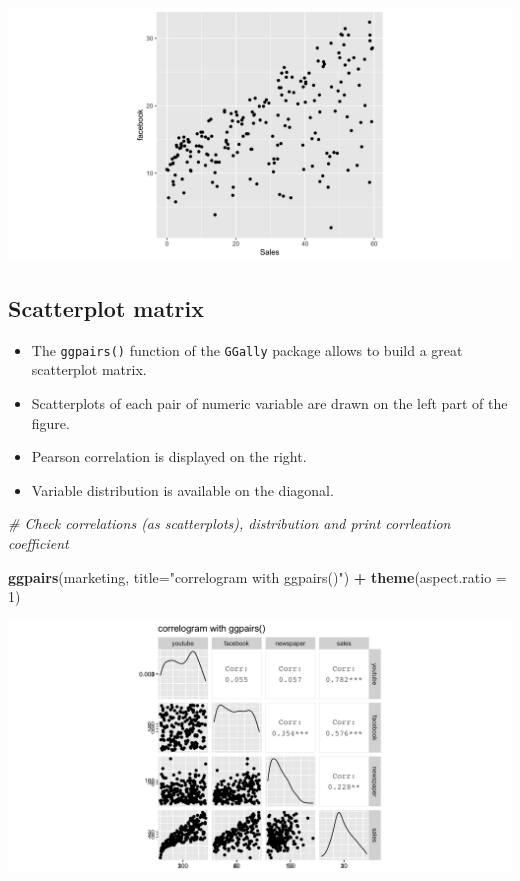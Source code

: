 \documentclass[]{book}
\newenvironment{Shaded}{\begin{snugshade}}{\end{snugshade}}
\newcommand{\CommentTok}[1]{\textcolor[rgb]{0.56,0.35,0.01}{\textit{#1}}}
\newcommand{\DataTypeTok}[1]{\textcolor[rgb]{0.13,0.29,0.53}{#1}}
\newcommand{\DecValTok}[1]{\textcolor[rgb]{0.00,0.00,0.81}{#1}}
\newcommand{\KeywordTok}[1]{\textcolor[rgb]{0.13,0.29,0.53}{\textbf{#1}}}
\newcommand{\NormalTok}[1]{#1}
\newcommand{\OperatorTok}[1]{\textcolor[rgb]{0.81,0.36,0.00}{\textbf{#1}}}
\newcommand{\StringTok}[1]{\textcolor[rgb]{0.31,0.60,0.02}{#1}}
\providecommand{\tightlist}{%
  \setlength{\itemsep}{0pt}\setlength{\parskip}{0pt}}
\begin{document}
\begin{center}\includegraphics{figure/unnamed-chunk-26-1} \end{center}

\hypertarget{scatterplot-matrix}{%
\subsection{Scatterplot matrix}\label{scatterplot-matrix}}

\begin{itemize}
\tightlist
\item
  The \texttt{ggpairs()} function of the \texttt{GGally} package allows to build a great scatterplot matrix.
\item
  Scatterplots of each pair of numeric variable are drawn on the left part of the figure.
\item
  Pearson correlation is displayed on the right.
\item
  Variable distribution is available on the diagonal.
\end{itemize}

\begin{Shaded}
\begin{Highlighting}[]
\CommentTok{# Check correlations (as scatterplots), distribution and print corrleation coefficient }

\KeywordTok{ggpairs}\NormalTok{(marketing, }\DataTypeTok{title=}\StringTok{"correlogram with ggpairs()"}\NormalTok{) }\OperatorTok{+}
\StringTok{   }\KeywordTok{theme}\NormalTok{(}\DataTypeTok{aspect.ratio =} \DecValTok{1}\NormalTok{)}
\end{Highlighting}
\end{Shaded}

\begin{center}\includegraphics{figure/unnamed-chunk-27-1} \end{center}
\end{document}
